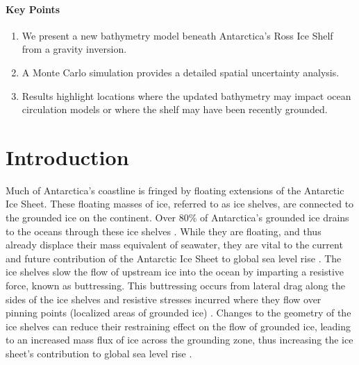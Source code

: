 \paragraph*{Key Points}
\begin{enumerate}
    \item We present a new bathymetry model beneath Antarctica's Ross Ice Shelf from a gravity inversion.
    \item A Monte Carlo simulation provides a detailed spatial uncertainty analysis.
    \item Results highlight locations where the updated bathymetry may impact ocean circulation models or where the shelf may have been recently grounded.
\end{enumerate}


\section{Introduction}

Much of Antarctica's coastline is fringed by floating extensions of the Antarctic Ice Sheet. These floating masses of ice, referred to as ice shelves, are connected to the grounded ice on the continent. Over 80\% of Antarctica's grounded ice drains to the oceans through these ice shelves \citep{rignoticeshelf2013}. While they are floating, and thus already displace their mass equivalent of seawater, they are vital to the current and future contribution of the Antarctic Ice Sheet to global sea level rise \citep{fürstsafety2016, jacobsmelting1992}. The ice shelves slow the flow of upstream ice into the ocean by imparting a resistive force, known as buttressing. This buttressing occurs from lateral drag along the sides of the ice shelves and resistive stresses incurred where they flow over pinning points (localized areas of grounded ice) \citep{dupontassessment2005, matsuokaantarctic2015}. Changes to the geometry of the ice shelves can reduce their restraining effect on the flow of grounded ice, leading to an increased mass flux of ice across the grounding zone, thus increasing the ice sheet's contribution to global sea level rise \citep[e.g.,][]{scambosglacier2004, pritchardantarctic2012}. \\

